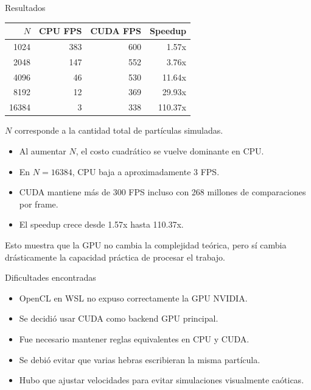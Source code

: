 \documentclass[aspectratio=169]{beamer}
\begin{document}
\begin{frame}{Resultados}
    \begin{table}
        \centering
        \small
        \begin{tabular}{rrrr}
            \toprule
            $N$ & CPU FPS & CUDA FPS & Speedup \\
            \midrule
            1024  & 383 & 600 & 1.57x \\
            2048  & 147 & 552 & 3.76x \\
            4096  & 46  & 530 & 11.64x \\
            8192  & 12  & 369 & 29.93x \\
            16384 & 3   & 338 & 110.37x \\
            \bottomrule
        \end{tabular}
    \end{table}

    {\scriptsize $N$ corresponde a la cantidad total de partículas simuladas.}

    \vspace{0.25cm}

    \begin{itemize}
        \item Al aumentar $N$, el costo cuadrático se vuelve dominante en CPU.
        \item En $N = 16384$, CPU baja a aproximadamente 3 FPS.
        \item CUDA mantiene más de 300 FPS incluso con 268 millones de comparaciones por frame.
        \item El speedup crece desde 1.57x hasta 110.37x.
    \end{itemize}

    \vspace{0.3cm}

    Esto muestra que la GPU no cambia la complejidad teórica, pero sí cambia drásticamente la capacidad práctica de procesar el trabajo.
\end{frame}

\begin{frame}{Dificultades encontradas}
    \begin{itemize}
        \item OpenCL en WSL no expuso correctamente la GPU NVIDIA.
        \item Se decidió usar CUDA como backend GPU principal.
        \item Fue necesario mantener reglas equivalentes en CPU y CUDA.
        \item Se debió evitar que varias hebras escribieran la misma partícula.
        \item Hubo que ajustar velocidades para evitar simulaciones visualmente caóticas.
    \end{itemize}
\end{frame}
\end{document}
